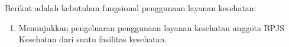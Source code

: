 Berikut adalah kebutuhan fungsional penggunaan layanan kesehatan:
\begin{enumerate}
	\item Menunjukkan pengeluaran penggunaan layanan kesehatan anggota BPJS Kesehatan dari suatu fasilitas kesehatan.
\end{enumerate}